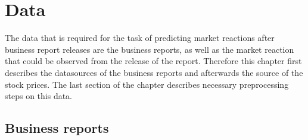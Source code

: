 \chapter{Data}\label{ch:data}

The data that is required for the task of predicting market reactions after business report releases are the business reports, as well as the market reaction that could be observed from the release of the report.
Therefore this chapter first describes the datasources of the business reports and afterwards the source of the stock prices.
The last section of the chapter describes necessary preprocessing steps on this data.

\section{Business reports}
\label{sec:business_reports}


